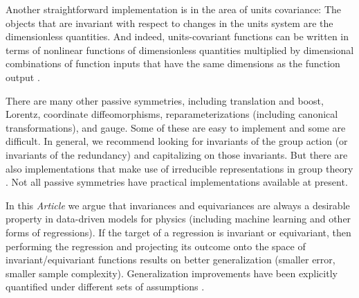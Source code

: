 \documentclass{article}
\theoremstyle{plain}
\theoremstyle{definition}
\theoremstyle{remark}
\newcommand{\documentname}{\textsl{Article}}
\begin{document}
{Another straightforward implementation is in the area of units covariance:
The objects that are invariant with respect to changes in the units system are the dimensionless quantities.
And indeed, units-covariant functions can be written in terms of nonlinear functions of dimensionless quantities multiplied by dimensional combinations of function inputs that have the same dimensions as the function output \cite{villar2022dimensionless}.

There are many other passive symmetries, including translation and boost, Lorentz, coordinate diffeomorphisms, reparameterizations (including canonical transformations), and gauge.
Some of these are easy to implement and some are difficult.
In general, we recommend looking for invariants of the group action (or invariants of the redundancy) and capitalizing on those invariants.
But there are also implementations that make use of irreducible representations in group theory \cite{fuchs2020se, thomas2018tensor, geiger2022e3nn}.
Not all passive symmetries have practical implementations available at present.

In this \documentname{} we argue that invariances and equivariances are always a desirable property in data-driven models for physics (including machine learning and other forms of regressions).
If the target of a regression is invariant or equivariant, then performing the regression and projecting its outcome onto the space of invariant/equivariant functions results on better generalization (smaller error, smaller sample complexity).
Generalization improvements have been explicitly quantified under different sets of assumptions \cite{bietti2021sample, elesedy2021provably, mei2021learning, elesedy2021kernel}. }
\end{document}

